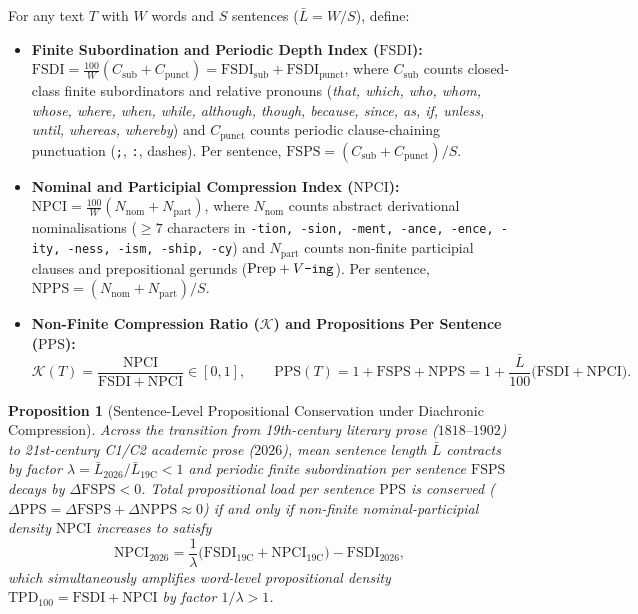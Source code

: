 \documentclass[11pt,reqno]{article}
\newtheorem{proposition}[theorem]{Proposition}
\begin{document}
For any text $T$ with $W$ words and $S$ sentences ($\bar{L} = W/S$), define:
\begin{itemize}
    \item \textbf{Finite Subordination and Periodic Depth Index ($\mathrm{FSDI}$):} $\mathrm{FSDI} = \frac{100}{W}(C_{\mathrm{sub}} + C_{\mathrm{punct}}) = \mathrm{FSDI}_{\mathrm{sub}} + \mathrm{FSDI}_{\mathrm{punct}}$, where $C_{\mathrm{sub}}$ counts closed-class finite subordinators and relative pronouns (\emph{that, which, who, whom, whose, where, when, while, although, though, because, since, as, if, unless, until, whereas, whereby}) and $C_{\mathrm{punct}}$ counts periodic clause-chaining punctuation (\texttt{;}, \texttt{:}, dashes). Per sentence, $\mathrm{FSPS} = (C_{\mathrm{sub}} + C_{\mathrm{punct}})/S$.
    \item \textbf{Nominal and Participial Compression Index ($\mathrm{NPCI}$):} $\mathrm{NPCI} = \frac{100}{W}(N_{\mathrm{nom}} + N_{\mathrm{part}})$, where $N_{\mathrm{nom}}$ counts abstract derivational nominalisations ($\ge 7$ characters in \texttt{-tion, -sion, -ment, -ance, -ence, -ity, -ness, -ism, -ship, -cy}) and $N_{\mathrm{part}}$ counts non-finite participial clauses and prepositional gerunds ($\mathrm{Prep} + V\text{\texttt{-ing}}$). Per sentence, $\mathrm{NPPS} = (N_{\mathrm{nom}} + N_{\mathrm{part}})/S$.
    \item \textbf{Non-Finite Compression Ratio ($\mathcal{K}$) and Propositions Per Sentence ($\mathrm{PPS}$):}
    \begin{equation}\label{eq:conservation}
    \mathcal{K}(T) = \frac{\mathrm{NPCI}}{\mathrm{FSDI} + \mathrm{NPCI}} \in [0,1], \qquad \mathrm{PPS}(T) = 1 + \mathrm{FSPS} + \mathrm{NPPS} = 1 + \frac{\bar{L}}{100}\big(\mathrm{FSDI} + \mathrm{NPCI}\big).
    \end{equation}
\end{itemize}

\begin{proposition}[Sentence-Level Propositional Conservation under Diachronic Compression]\label{prop:diachronic}
Across the transition from 19th-century literary prose ($1818\text{--}1902$) to 21st-century C1/C2 academic prose ($2026$), mean sentence length $\bar{L}$ contracts by factor $\lambda = \bar{L}_{2026}/\bar{L}_{19\mathrm{C}} < 1$ and periodic finite subordination per sentence $\mathrm{FSPS}$ decays by $\Delta\mathrm{FSPS} < 0$. Total propositional load per sentence $\mathrm{PPS}$ is conserved ($\Delta\mathrm{PPS} = \Delta\mathrm{FSPS} + \Delta\mathrm{NPPS} \approx 0$) if and only if non-finite nominal-participial density $\mathrm{NPCI}$ increases to satisfy
\begin{equation}\label{eq:npci_law}
\mathrm{NPCI}_{2026} = \frac{1}{\lambda}\big(\mathrm{FSDI}_{19\mathrm{C}} + \mathrm{NPCI}_{19\mathrm{C}}\big) - \mathrm{FSDI}_{2026},
\end{equation}
which simultaneously amplifies word-level propositional density $\mathrm{TPD}_{100} = \mathrm{FSDI} + \mathrm{NPCI}$ by factor $1/\lambda > 1$.
\end{proposition}
\end{document}
